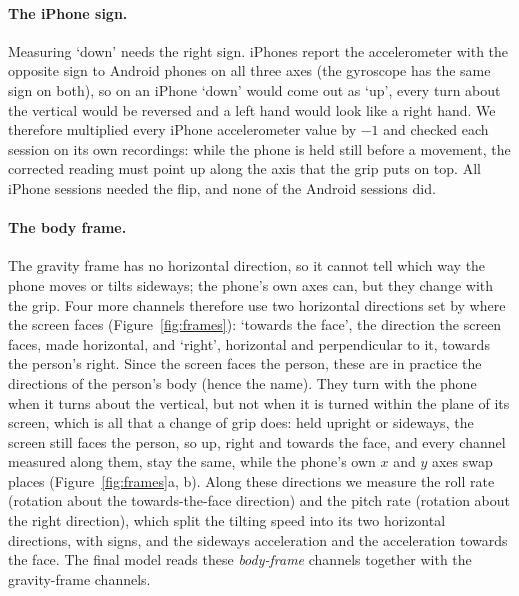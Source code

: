 \paragraph{The iPhone sign.} Measuring `down' needs the right sign. iPhones report the accelerometer with the opposite
sign to Android phones on all three axes (the gyroscope has the same sign on both), so on an iPhone `down' would come
out as `up', every turn about the vertical would be reversed and a left hand would look like a right hand. We therefore
multiplied every iPhone accelerometer value by $-1$ and checked each session on its own recordings: while the phone is
held still before a movement, the corrected reading must point up along the axis that the grip puts on top. All
 iPhone sessions needed the flip, and none of the 
Android sessions did.

\paragraph{The body frame.} The gravity frame has no horizontal direction, so it cannot tell which way the phone moves
or tilts sideways; the phone's own axes can, but they change with the grip. Four more channels therefore use two
horizontal directions set by where the screen faces (Figure~\ref{fig:frames}): `towards the face', the direction the
screen faces, made horizontal, and `right', horizontal and perpendicular to it, towards the person's right. Since the
screen faces the person, these are in practice the directions of the person's body (hence the name). They turn with the phone when it turns about the vertical, but not when it is turned
within the plane of its screen, which is all that a change of grip does: held upright or sideways, the screen still
faces the person, so up, right and towards the face, and every channel measured along them, stay the same, while the
phone's own $x$ and $y$ axes swap places (Figure~\ref{fig:frames}a, b). Along these directions we measure the roll
rate (rotation about the towards-the-face direction) and the pitch rate (rotation about the right direction), which
split the tilting speed into its two horizontal directions, with signs, and the sideways acceleration and the
acceleration towards the face. The final model reads these 
\emph{body-frame} channels together with the  gravity-frame channels.

